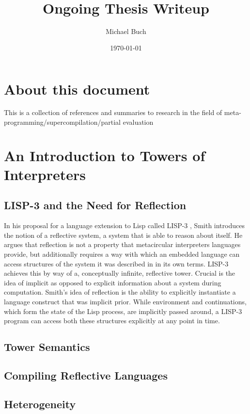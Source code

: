 \documentclass{article}
\title{Ongoing Thesis Writeup}
\author{Michael Buch}
\date{\today}
\begin{document}
\maketitle
\frenchspacing

\newcommand{\mslang}{$\lambda\uparrow\downarrow$}
\newcommand{\mslangStar}{$\lambda\uparrow\downarrow^*$}

\section{About this document}
This is a collection of references and summaries to research in the field of meta-programming/supercompilation/partial evaluation

\section{An Introduction to Towers of Interpreters}
\subsection{LISP-3 and the Need for Reflection}
In his proposal for a language extension to Lisp called LISP-3 \cite{smith1984reflection}, Smith introduces the notion of a reflective system, a system that is able to reason about itself. He argues that reflection is not a property that metacircular interpreters languages provide, but additionally requires a way with which an embedded language can access structures of the system it was described in in its own terms. LISP-3 achieves this by way of a, conceptually infinite, reflective tower. Crucial is the idea of implicit as opposed to explicit information about a system during computation. Smith's idea of reflection is the ability to explicitly instantiate a language construct that was implicit prior. While environment and continuations, which form the state of the Lisp process, are implicitly passed around, a LISP-3 program can access both these structures explicitly at any point in time.

\subsection{Tower Semantics}
\subsection{Compiling Reflective Languages}
\subsection{Heterogeneity}
\end{document}
